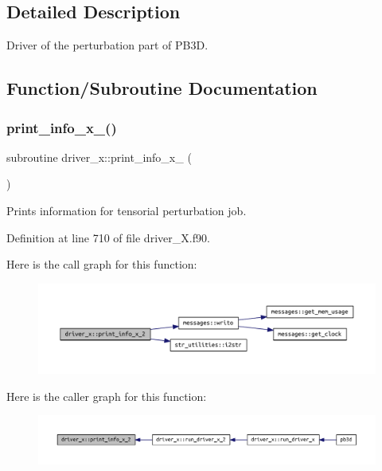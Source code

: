 \subsection{Detailed Description}
Driver of the perturbation part of P\+B3D. 

\subsection{Function/\+Subroutine Documentation}
\mbox{\label{namespacedriver__x_aca49d362e21df044e21d5ba4b2599cf4}} 
\subsubsection{\texorpdfstring{print\+\_\+info\+\_\+x\+\_()}{print\_info\_x\_2()}}
{\footnotesize\ttfamily subroutine driver\+\_\+x\+::print\+\_\+info\+\_\+x\+\_ (\begin{DoxyParamCaption}{ }\end{DoxyParamCaption})}



Prints information for tensorial perturbation job. 



Definition at line 710 of file driver\+\_\+\+X.\+f90.

Here is the call graph for this function\+:\nopagebreak
\begin{figure}[H]
\begin{center}
\leavevmode
\includegraphics[width=350pt]{namespacedriver__x_aca49d362e21df044e21d5ba4b2599cf4_cgraph}
\end{center}
\end{figure}
Here is the caller graph for this function\+:\nopagebreak
\begin{figure}[H]
\begin{center}
\leavevmode
\includegraphics[width=350pt]{namespacedriver__x_aca49d362e21df044e21d5ba4b2599cf4_icgraph}
\end{center}
\end{figure}
\mbox{\label{namespacedriver__x_ada3d72a0929daaa5e3da585246d62281}} 
